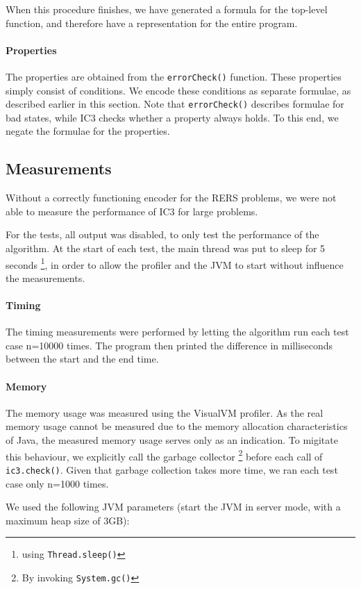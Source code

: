\documentclass[a4paper]{article}
\begin{document}
When this procedure finishes, we have generated a formula for the top-level function, and therefore have a representation for the entire program.

\paragraph{Properties}
The properties are obtained from the \texttt{errorCheck()} function. These properties simply consist of conditions. We encode these conditions as separate formulae, as described earlier in this section. Note that \texttt{errorCheck()} describes formulae for bad states, while IC3 checks whether a property always holds. To this end, we negate the formulae for the properties.

\subsection{Measurements}
Without a correctly functioning encoder for the RERS problems, we were not able to measure the performance of IC3 for large problems.

For the tests, all output was disabled, to only test the performance of the algorithm. At the start of each test, the main thread was put to sleep for 5 seconds \footnote{using \texttt{Thread.sleep()}}, in order to allow the profiler and the JVM to start without influence the measurements.

\paragraph{Timing}
The timing measurements were performed by letting the algorithm run each test case n=10000 times. The program then printed the difference in milliseconds between the start and the end time.

\paragraph{Memory} The memory usage was measured using the VisualVM profiler. As the real memory usage cannot be measured due to the memory allocation characteristics of Java, the measured memory usage serves only as an indication. To migitate this behaviour, we explicitly call the garbage collector \footnote{By invoking \texttt{System.gc()}} before each call of \texttt{ic3.check()}. Given that garbage collection takes more time, we ran each test case only n=1000 times.


We used the following JVM parameters (start the JVM in server mode, with a maximum heap size of 3GB):
\end{document}
